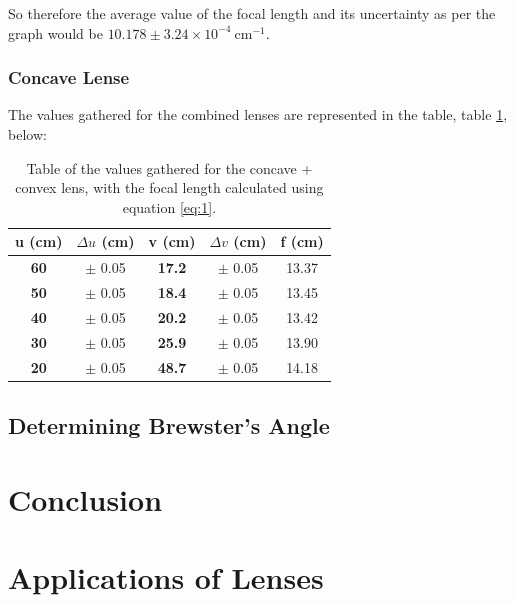 \documentclass[12pt]{article}
\begin{document}
So therefore the average value of the focal length and its uncertainty as per the graph would be $10.178 \pm 3.24 \times 10^{-4} \: \text{cm}^{-1}$.

\subsubsection{Concave Lense} \label{sec:3.1.2}

The values gathered for the combined lenses are represented in the table, table \ref{tab:4}, below:

\begin{table}[H]
    \centering

    \begin{tabular}{|c|c|c|c|c|}
    \hline
    \textbf{u (cm)} & $\Delta u$ (cm) & \textbf{v (cm)} & $\Delta v$ (cm) & f (cm) \\ \hline
    \textbf{60}     & $\pm$ 0.05      & \textbf{17.2}   & $\pm$ 0.05      & 13.37  \\ \hline
    \textbf{50}     & $\pm$ 0.05      & \textbf{18.4}   & $\pm$ 0.05      & 13.45  \\ \hline
    \textbf{40}     & $\pm$ 0.05      & \textbf{20.2}   & $\pm$ 0.05      & 13.42  \\ \hline
    \textbf{30}     & $\pm$ 0.05      & \textbf{25.9}   & $\pm$ 0.05      & 13.90  \\ \hline
    \textbf{20}     & $\pm$ 0.05      & \textbf{48.7}   & $\pm$ 0.05      & 14.18  \\ \hline
    \end{tabular}

    \caption{\centering Table of the values gathered for the concave + convex lens, with the focal length calculated using equation \ref{eq:1}.}
    \label{tab:4}
\end{table}



\subsection{Determining Brewster's Angle} \label{sec:3.2}



\section{Conclusion} \label{sec:4}


\section{Applications of Lenses}
\end{document}
